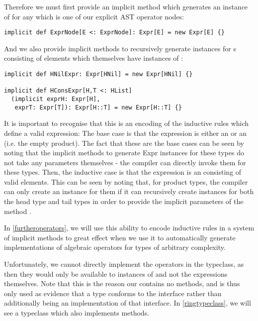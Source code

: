Therefore we must first provide an implicit method which generates an instance of  for any  which is one of our explicit AST operator nodes:
\vs\begin{lstlisting}
implicit def ExprNode[E <: ExprNode]: Expr[E] = new Expr[E] {}
\end{lstlisting} \vs
And we also provide implicit methods to recursively generate instances for s consisting of elements which themselves have instances of :
\vs\begin{lstlisting}
implicit def HNilExpr: Expr[HNil] = new Expr[HNil] {}

implicit def HConsExpr[H,T <: HList]
  (implicit exprH: Expr[H],
   exprT: Expr[T]): Expr[H::T] = new Expr[H::T] {}
\end{lstlisting}\vs
It is important to recognise that this is an encoding of the inductive rules which define a valid expression: The base case is that the expression is either an  or an  (i.e. the empty product). The fact that these are the base cases can be seen by noting that the implicit methods to generate Expr instances for these types do not take any parameters themselves - the compiler can directly invoke them for these types. Then, the inductive case is that the expression is an  consisting of valid  elements. This can be seen by noting that, for product types, the compiler can only create an  instance for them if it can recursively create  instances for both the head type and tail types in order to provide the implicit parameters of the method .

In \ref{furtheroperators}, we will use this ability to encode inductive rules in a system of implicit methods to great effect when we use it to automatically generate implementations of algebraic operators for types of arbitrary complexity.

\vs Unfortunately, we cannot directly implement the operators in the  typeclass, as then they would only be available to instances of  and not the expressions themselves. Note that this is the reason our  contains no methods, and is thus only used as evidence that a type conforms to the  interface rather than additionally being an implementation of that interface. In \ref{ringtypeclass}, we will see a typeclass which also implements methods.

